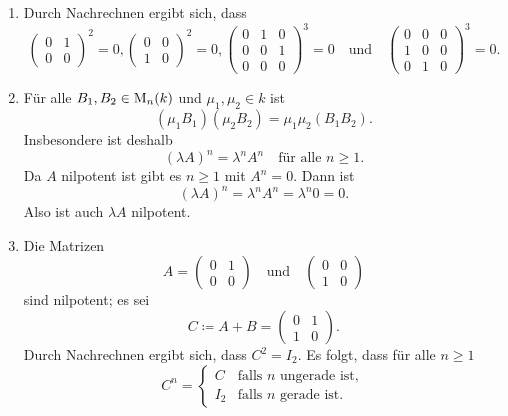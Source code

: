 \begin{solution}
 \begin{enumerate}
  \item
   Durch Nachrechnen ergibt sich, dass
   \[
    \begin{pmatrix}
     0 & 1 \\
     0 & 0
    \end{pmatrix}^2
    = 0, 
    \begin{pmatrix}
     0 & 0 \\
     1 & 0
    \end{pmatrix}^2
    = 0,
    \begin{pmatrix}
     0 & 1 & 0 \\
     0 & 0 & 1 \\
     0 & 0 & 0
    \end{pmatrix}^3
    =0
    \quad \text{und} \quad
    \begin{pmatrix}
     0 & 0 & 0 \\
     1 & 0 & 0 \\
     0 & 1 & 0
    \end{pmatrix}^3
    = 0.
   \]
  \item
   Für alle $B_1, B_2 \in \operatorname{M}_n(k)$ und $\mu_1, \mu_2 \in k$ ist
   \[
    (\mu_1 B_1) (\mu_2 B_2) = \mu_1 \mu_2 (B_1 B_2).
   \]
   Insbesondere ist deshalb
   \[
    (\lambda A)^n = \lambda^n A^n \quad \text{für alle $n \geq 1$}.
   \]
   Da $A$ nilpotent ist gibt es $n \geq 1$ mit $A^n = 0$. Dann ist
   \[
    (\lambda A)^n = \lambda^n A^n = \lambda^n 0 = 0.
   \]
   Also ist auch $\lambda A$ nilpotent.
  \item
   Die Matrizen
   \[
    A =
    \begin{pmatrix}
     0 & 1 \\
     0 & 0
    \end{pmatrix}
    \quad \text{und} \quad
    \begin{pmatrix}
     0 & 0 \\
     1 & 0
    \end{pmatrix}
   \]
   sind nilpotent; es sei
   \[
    C \coloneqq A + B =
    \begin{pmatrix}
     0 & 1 \\
     1 & 0
    \end{pmatrix}.
   \]
   Durch Nachrechnen ergibt sich, dass $C^2 = I_2$. Es folgt, dass für alle $n \geq 1$
   \[
    C^n =
    \begin{cases}
     C   & \text{falls $n$ ungerade ist}, \\
     I_2 & \text{falls $n$ gerade ist}.

\end{cases}\]
\end{enumerate}
\end{solution}
